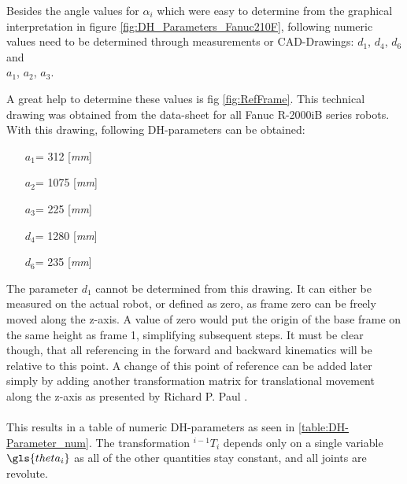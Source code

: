 Besides the angle values for $\alpha_i$ which were easy to determine from the graphical interpretation in figure \ref{fig:DH_Parameters_Fanuc210F}, following numeric values need to be determined through measurements or CAD-Drawings:
$d_1$, $d_4$, $d_6$ and \\
$a_1$, $a_2$, $a_3$. 

A great help to determine these values is fig \ref{fig:RefFrame}. This technical drawing was obtained from the data-sheet for all Fanuc R-2000iB series robots. 
With this drawing, following \ac{DH}-parameters can be obtained:

\begin{itemize}\label{item:DH-LinparamValues}
	\item[$a_1$=] 312 [\textit{mm}]
	\item[$a_2$=] 1075 [\textit{mm}]
	\item[$a_3$=] 225 [\textit{mm}]
	\item[$d_4$=] 1280 [\textit{mm}]
	\item[$d_6$=] 235 [\textit{mm}]
\end{itemize}

The parameter $d_1$ cannot be determined from this drawing. It can either be measured on the actual robot, or defined as zero, as frame zero can be freely moved along the z-axis. A value of zero would put the origin of the base frame on the same height as frame 1, simplifying subsequent steps. 
It must be clear though, that all referencing in the forward and backward kinematics will be relative to this point. 
A change of this point of reference can be added later simply by adding another transformation matrix for translational movement along the z-axis as presented by Richard P. Paul \cite{Paul1981RobotM}.\\
\\
This results in a table of numeric DH-parameters as seen in \ref{table:DH-Parameter_num}. The transformation $^{i-1}T_i$ depends only on a single variable $\gls{theta_i}$ as all of the other quantities stay constant, and all joints are revolute.

